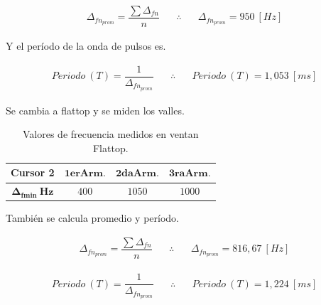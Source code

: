       \begin{align*}
        \Delta_{fn_{prom}}=\dfrac{\sum{\Delta_{fn}}}{n} \hspace{20pt} \therefore \hspace{20pt} \boxed{\Delta_{fn_{prom}}=950~[Hz]}
      \end{align*}

      Y el período de la onda de pulsos es.

      \begin{align*}
        Periodo~\left( T \right)=\dfrac{1}{\Delta_{fn_{prom}}} \hspace{20pt} \therefore \hspace{20pt} \boxed{Periodo~\left( T \right)=1,053~[ms]}
      \end{align*}

      Se cambia a flattop y se miden los valles.

      \begin{table}[H]
      \centering
        \begin{tabular}{cccc} \hline \hline
          \textbf{Cursor 2}               &  $\mathbf{1erArm.}$       & $\mathbf{2daArm.}$        & $\mathbf{3raArm.}$   \\ \hline
          $\mathbf{\Delta_{fmin}~Hz}$       &   $400$                        &    $1050$                    &   $1000$                     \\
         \end{tabular}
          \caption{Valores de frecuencia medidos en ventan Flattop.}
          \label{tab:Exp1MedicionesFlattop}
      \end{table}  

      También se calcula promedio y período.

      \begin{align*}
        \Delta_{fn_{prom}}=\dfrac{\sum{\Delta_{fn}}}{n} \hspace{20pt} \therefore \hspace{20pt} \boxed{\Delta_{fn_{prom}}=816,67~[Hz]}
      \end{align*}        

      \begin{align*}
        Periodo~\left( T \right)=\dfrac{1}{\Delta_{fn_{prom}}} \hspace{20pt} \therefore \hspace{20pt} \boxed{Periodo~\left( T \right)=1,224~[ms]}
      \end{align*}